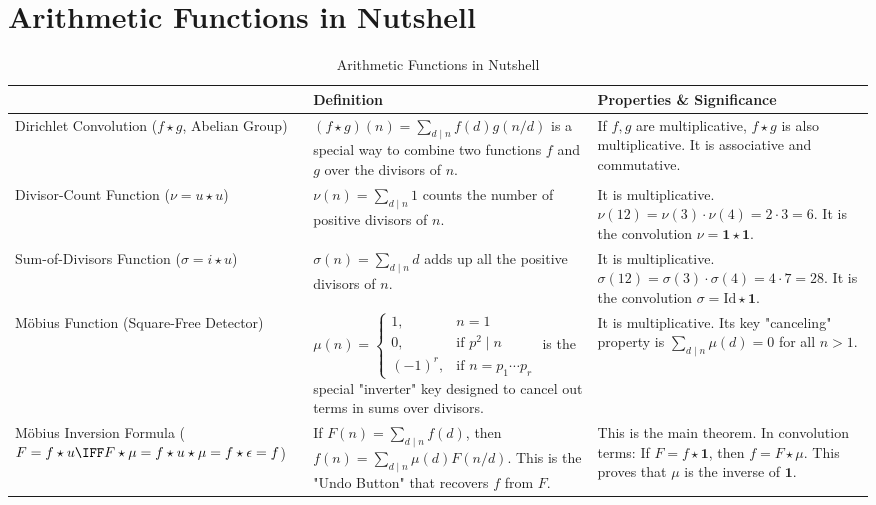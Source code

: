 \section*{Arithmetic Functions in Nutshell}
\newcommand{\one}{\mathbf{1}}
\newcommand{\Id}{\text{Id}}
\begin{table}[htbp]
  \centering
  \caption{Arithmetic Functions in Nutshell}
  \label{tab:arithmetic_functions_summary}
  \renewcommand{\arraystretch}{1.6}
  \begin{tabularx}{\textwidth}{@{} l X X @{}}
    \hline
    \textbf{\nameref{def:arithmeticfunction}} & 
    \textbf{Definition} & \textbf{Properties \& Significance} \\
    \hline
    \rule{0pt}{3ex}
    Dirichlet Convolution ($f \star g$, Abelian Group) 
    & $(f \star g)(n) = \sum_{d \mid n} f(d)g(n/d)$ is a special way to combine two functions $f$ and $g$ over the divisors of $n$.
    & If $f, g$ are multiplicative, $f \star g$ is also multiplicative. It is associative and commutative. \\
    \rule{0pt}{3ex}
    Divisor-Count Function ($\nu = u \star u$)
    & $\nu(n) = \sum_{d \mid n} 1$ counts the number of positive divisors of $n$.
    & It is multiplicative. $\nu(12) = \nu(3) \cdot \nu(4) = 2 \cdot 3 = 6$. It is the convolution $\nu = \one \star \one$. \\
    \rule{0pt}{3ex}
    Sum-of-Divisors Function  ($\sigma = i \star u$)
    & $\sigma(n) = \sum_{d \mid n} d$ adds up all the positive divisors of $n$.
    & It is multiplicative. $\sigma(12) = \sigma(3) \cdot \sigma(4) = 4 \cdot 7 = 28$. It is the convolution $\sigma = \Id \star \one$. \\
    \rule{0pt}{3ex}
    Möbius Function 
    (Square-Free Detector)
    & $\mu(n)=
    \begin{cases}
    1,& n=1\\
    0,&\text{if } p^2\mid n \\
    (-1)^r,&\text{if } n=p_1\cdots p_r
    \end{cases}$ is the special "inverter" key designed to cancel out terms in sums over divisors.
    & It is multiplicative. Its key "canceling" property is $\sum_{d \mid n} \mu(d) = 0$ for all $n>1$. \\
    \rule{0pt}{3ex}
    Möbius Inversion Formula ($F = f \star u \IFF F \star \mu = f \star u \star \mu = f \star \epsilon = f$)
    & If $F(n) = \sum_{d \mid n} f(d)$, then $f(n) = \sum_{d \mid n} \mu(d)F(n/d)$. This is the "Undo Button" that recovers $f$ from $F$.
    & This is the main theorem. In convolution terms: If $F = f \star \one$, then $f = F \star \mu$. This proves that $\mu$ is the inverse of $\one$. \\
    \hline
  \end{tabularx}
\end{table}
\newpage

